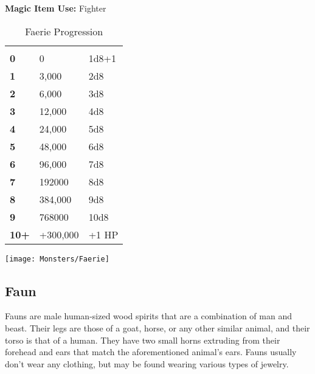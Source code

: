 \begin{multicols*}{2}
{\textbf{Magic Item Use:} Fighter}

\begin {table}[H]
  \caption{Faerie Progression}
  \begin{tabularx}{\columnwidth}{>{\bfseries}YYY}
	 &  & \\
	0 & 0 & 1d8+1\\
	1 & 3,000 & 2d8\\
	2 & 6,000 & 3d8\\
	3 & 12,000 & 4d8\\
	4 & 24,000 & 5d8\\
	5 & 48,000 & 6d8\\
	6 & 96,000 & 7d8\\
	7 & 192000 & 8d8\\
	8 & 384,000 & 9d8\\
	9 & 768000 & 10d8\\
	10+ & +300,000 & +1 HP
  \end {tabularx}
\end {table}

\texttt{[image: Monsters/Faerie]}

\subsection{Faun}

Fauns are male human-sized wood spirits that are a combination of man and beast. Their legs are those of a goat, horse, or any other similar animal, and their torso is that of a human. They have two small horns extruding from their forehead and ears that match the aforementioned animal's ears. Fauns usually don't wear any clothing, but may be found wearing various types of jewelry.


\end{multicols*}
